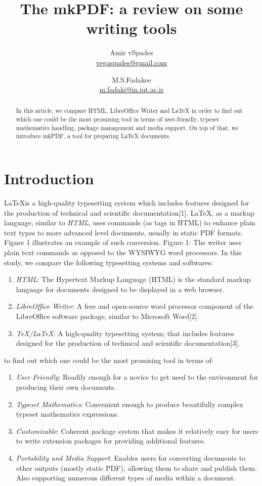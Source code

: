 \documentclass[twocolumn]{article}
\title{The mkPDF: a review on some writing tools}
\author{
Amir vSpades \\ \url{vegaspades@gmail.com}
\and
M.S.Fadakee \\ \url{m.fadaki@in.iut.ac.ir}
}
\date{}
\begin{document}
\maketitle
\begin{abstract}
In this article, we compare HTML, LibreOffice Writer and LaTeX in order to find
out which one could be the most promising tool in terms of user-friendly,
typeset mathematics handling, package management and media support. On top of
that, we introduce mkPDF, a tool for preparing LaTeX documents.
\end{abstract}
\section{Introduction}
\LaTeX is a high-quality typesetting system which includes features designed for
the production of technical and scientific documentation[1]. \LaTeX, as a
markup language, similar to \textit{HTML}, uses commands (as tags in HTML) to
enhance plain text types to more advanced level documents, usually in static PDF
formats. Figure 1 illustrates an example of such conversion.
\newline
Figure 1: The writer uses plain text commands as opposed to the WYSIWYG word
processors.
\newline
In this study, we compare the following typesetting systems and softwares:
\begin{enumerate}
\item \textit{HTML}: The Hypertext Markup Language (HTML) is the standard markup
language for documents designed to be displayed in a web browser.
\item \textit{LibreOffice Writer}: A free and open-source word processor
component of the LibreOffice software package, similar to Microsoft Word[2].
\item \textit{TeX/LaTeX}: A high-quality typesetting system; that includes
features designed for the production of technical and scientific
documentation[3].
\end{enumerate}
to find out which one could be the most promising tool in terms of:
\begin{enumerate}
\item \textit{User Friendly}: Readily enough for a novice to get used to the
environment for producing their own documents.
\item \textit{Typeset Mathematics}: Convenient enough to produce beautifully
complex typeset mathematics expressions.
\item \textit{Customizable}: Coherent package system that makes it relatively
easy for users to write extension packages for providing additional features.
\item \textit{Portability and Media Support}: Enables users for converting
documents to other outputs (mostly static PDF), allowing them to share and
publish them. Also supporting numerous different types of media within a
document.
\end{enumerate}
\end{document}
